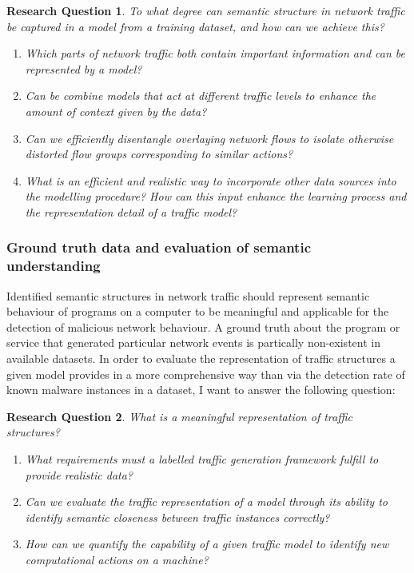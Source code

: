 \documentclass[a4paper,12pt,twoside]{report}
\newtheorem{rquestion}{Research Question}
\begin{document}
\begin{rquestion}
To what degree can semantic structure in network traffic be captured in a model from a training dataset, and how can we achieve this?
\begin{enumerate}
\item Which parts of network traffic both contain important information and can be represented by a model?
\item Can be combine models that act at different traffic levels to enhance the amount of context given by the data? 
\item Can we efficiently disentangle overlaying network flows to isolate otherwise distorted flow groups corresponding to similar actions? 
\item What is an efficient and realistic way to incorporate other data sources into the modelling procedure? How can this input enhance the learning process and the representation detail of a traffic model? 
\end{enumerate}
\end{rquestion}



\subsubsection{Ground truth data and evaluation of semantic understanding}

Identified semantic structures in network traffic should represent semantic behaviour of programs on a computer to be meaningful and applicable for the detection of malicious network behaviour. A ground truth about the program or service that generated particular network events is partically non-existent in available datasets. In order to evaluate the representation of traffic structures a given model provides in a more comprehensive way than via the detection rate of known malware instances in a dataset, I want to answer the following question:

\begin{rquestion}
What is a meaningful representation of traffic structures?
\begin{enumerate}
\item What requirements must a labelled traffic generation framework fulfill to provide realistic data?
\item Can we evaluate the traffic representation of a model through its ability to identify semantic closeness between traffic instances correctly?
\item How can we quantify the capability of a given traffic model to identify new computational actions on a machine?
\end{enumerate}
\end{rquestion}
\end{document}
